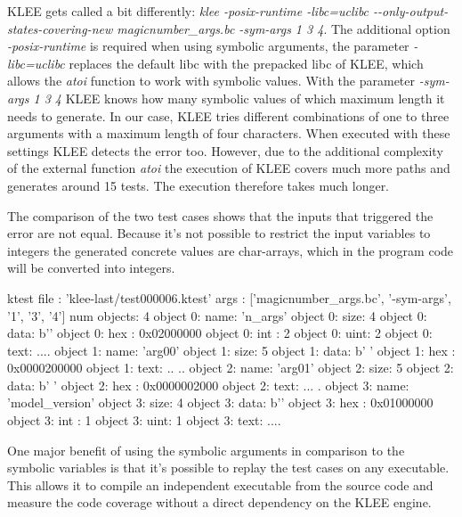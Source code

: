 KLEE gets called a bit differently: \textit{klee -posix-runtime -libc=uclibc -{}-only-output-states-covering-new magicnumber\_args.bc -sym-args 1 3 4}.
The additional option \textit{-posix-runtime} is required when using symbolic arguments, the parameter \textit{-libc=uclibc} replaces the default libc with the prepacked libc of KLEE, which allows the \textit{atoi} function to work with symbolic values.
With the parameter \textit{-sym-args 1 3 4} KLEE knows how many symbolic values of which maximum length it needs to generate. In our case, KLEE tries different combinations of one to three arguments with a maximum length of four characters.
When executed with these settings KLEE detects the error too. However, due to the additional complexity of the external function \textit{atoi} the execution of KLEE covers much more paths and generates around 15 tests. The execution therefore takes much longer.

The comparison of the two test cases shows that the inputs that triggered the error are not equal.
Because it's not possible to restrict the input variables to integers the generated concrete values are char-arrays, which in the program code will be converted into integers.

\begin{customlisting}[caption={The test case generated by KLEE which triggers the assertion error when executing it on the code snippet \ref{codeSnippet:klee_arguments}}, label={listing:test_case_two}]
ktest file : 'klee-last/test000006.ktest'
args       : ['magicnumber_args.bc',
              '-sym-args', '1', '3', '4']
num objects: 4
object 0: name: 'n_args'
object 0: size: 4
object 0: data: b''
object 0: hex : 0x02000000
object 0: int : 2
object 0: uint: 2
object 0: text: ....
object 1: name: 'arg00'
object 1: size: 5
object 1: data: b' '
object 1: hex : 0x0000200000
object 1: text: .. ..
object 2: name: 'arg01'
object 2: size: 5
object 2: data: b' '
object 2: hex : 0x0000002000
object 2: text: ... .
object 3: name: 'model_version'
object 3: size: 4
object 3: data: b''
object 3: hex : 0x01000000
object 3: int : 1
object 3: uint: 1
object 3: text: ....
\end{customlisting}

One major benefit of using the symbolic arguments in comparison to the symbolic variables is that it's possible to replay the test cases on any executable.
This allows it to compile an independent executable from the source code and measure the code coverage without a direct dependency on the KLEE engine.

